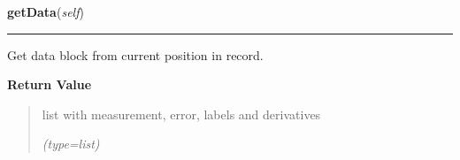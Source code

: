     \vspace{0.5ex}

\hspace{.8\funcindent}\begin{boxedminipage}{\funcwidth}

    \raggedright \textbf{getData}(\textit{self})

    \vspace{-1.5ex}

    \rule{\textwidth}{0.5\fboxrule}
\setlength{\parskip}{2ex}
    Get data block from current position in record.

\setlength{\parskip}{1ex}
      \textbf{Return Value}
    \vspace{-1ex}

      \begin{quote}
      list with measurement, error, labels and derivatives

      {\it (type=list)}

      \end{quote}

    \end{boxedminipage}

    \label{mille:MilleRecord:addSpecial}

    \vspace{0.5ex}

